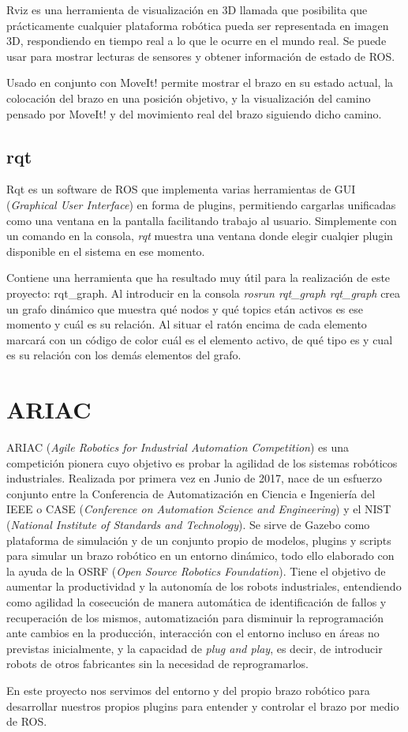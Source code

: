 Rviz\cite{rviz} es una herramienta de visualización en 3D llamada que posibilita que  prácticamente cualquier plataforma robótica pueda ser representada en imagen 3D, respondiendo en tiempo real a lo que le ocurre en el mundo real. Se puede usar para mostrar lecturas de sensores y obtener información de estado de ROS.

Usado en conjunto con MoveIt! permite mostrar el brazo en su estado actual, la colocación del brazo en una posición objetivo, y la visualización del camino pensado por MoveIt! y del movimiento real del brazo siguiendo dicho camino.

\subsection{rqt}
\label{subsec:plat_rqt}

Rqt\cite{rqt} es un software de ROS que implementa varias herramientas de GUI (\textit{Graphical User Interface}) en forma de plugins, permitiendo cargarlas unificadas como una ventana en la pantalla facilitando trabajo al usuario. Simplemente con un comando en la consola, \textit{rqt} muestra una ventana donde elegir cualqier plugin disponible en el sistema en ese momento.

Contiene una herramienta que ha resultado muy útil para la realización de este proyecto: rqt\_graph. Al introducir en la consola \textit{rosrun rqt\_graph rqt\_graph} crea un grafo dinámico que muestra qué nodos y qué topics etán activos es ese momento y cuál es su relación. Al situar el ratón encima de cada elemento marcará con un código de color cuál es el elemento activo, de qué tipo es y cual es su relación con los demás elementos del grafo.


\section{ARIAC}
\label{sec:plat_ariac}

ARIAC\cite{ariac} (\textit{Agile Robotics for Industrial Automation Competition}) es una competición pionera cuyo objetivo es probar la agilidad de los sistemas robóticos industriales. Realizada por primera vez en Junio de 2017, nace de un esfuerzo conjunto entre la Conferencia de Automatización en Ciencia e Ingeniería del IEEE o CASE (\textit{Conference on Automation Science and Engineering}) y el NIST (\textit{National Institute of Standards and Technology}). Se sirve de Gazebo como plataforma de simulación y de un conjunto propio de modelos, plugins y scripts para simular un brazo robótico en un entorno dinámico, todo ello elaborado con la ayuda de la OSRF (\textit{Open Source Robotics Foundation}). Tiene el objetivo de aumentar la productividad y la autonomía de los robots industriales, entendiendo como agilidad la cosecución de manera automática de identificación de fallos y recuperación de los mismos, automatización para disminuir la reprogramación ante cambios en la producción, interacción con el entorno incluso en áreas no previstas inicialmente, y la capacidad de \textit{plug and play}, es decir, de introducir robots de otros fabricantes sin la necesidad de reprogramarlos.

En este proyecto nos servimos del entorno y del propio brazo robótico para desarrollar nuestros propios plugins para entender y controlar el brazo por medio de ROS.




